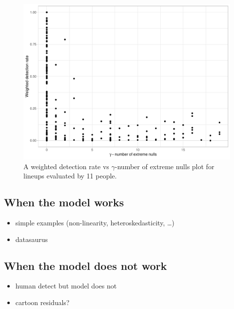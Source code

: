 \documentclass[]{interact}
\theoremstyle{plain}%
\theoremstyle{definition}
\theoremstyle{remark}
\providecommand{\tightlist}{%
  \setlength{\itemsep}{0pt}\setlength{\parskip}{0pt}}
\def\tightlist{}
\begin{document}
\begin{figure}

{\centering \includegraphics[width=1\linewidth]{paper_files/figure-latex/unnamed-chunk-7-1} 

}

\caption{A weighted detection rate vs $\gamma$-number of extreme nulls plot for lineups evaluated by 11 people.}\label{fig:unnamed-chunk-7}
\end{figure}

\hypertarget{when-the-model-works}{%
\subsection{When the model works}\label{when-the-model-works}}

\begin{itemize}
\tightlist
\item
  simple examples (non-linearity, heteroskedasticity, \ldots)
\item
  datasaurus
\end{itemize}

\hypertarget{when-the-model-does-not-work}{%
\subsection{When the model does not
work}\label{when-the-model-does-not-work}}

\begin{itemize}
\tightlist
\item
  human detect but model does not
\item
  cartoon residuals?
\end{itemize}
\end{document}
